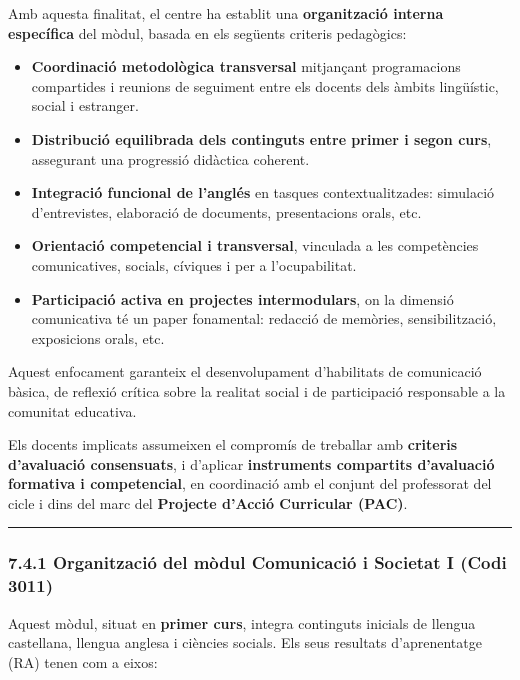 \documentclass[
  paper=a4,
  ,captions=tableheading
]{scrartcl}
\providecommand{\tightlist}{%
  \setlength{\itemsep}{0pt}\setlength{\parskip}{0pt}}
\begin{document}
Amb aquesta finalitat, el centre ha establit una \textbf{organització
interna específica} del mòdul, basada en els següents criteris
pedagògics:

\begin{itemize}
\tightlist
\item
  \textbf{Coordinació metodològica transversal} mitjançant programacions
  compartides i reunions de seguiment entre els docents dels àmbits
  lingüístic, social i estranger.
\item
  \textbf{Distribució equilibrada dels continguts entre primer i segon
  curs}, assegurant una progressió didàctica coherent.
\item
  \textbf{Integració funcional de l'anglés} en tasques
  contextualitzades: simulació d'entrevistes, elaboració de documents,
  presentacions orals, etc.
\item
  \textbf{Orientació competencial i transversal}, vinculada a les
  competències comunicatives, socials, cíviques i per a l'ocupabilitat.
\item
  \textbf{Participació activa en projectes intermodulars}, on la
  dimensió comunicativa té un paper fonamental: redacció de memòries,
  sensibilització, exposicions orals, etc.
\end{itemize}

Aquest enfocament garanteix el desenvolupament d'habilitats de
comunicació bàsica, de reflexió crítica sobre la realitat social i de
participació responsable a la comunitat educativa.

Els docents implicats assumeixen el compromís de treballar amb
\textbf{criteris d'avaluació consensuats}, i d'aplicar
\textbf{instruments compartits d'avaluació formativa i competencial}, en
coordinació amb el conjunt del professorat del cicle i dins del marc del
\textbf{Projecte d'Acció Curricular (PAC)}.

\begin{center}\rule{0.5\linewidth}{0.5pt}\end{center}

\hypertarget{organitzaciuxf3-del-muxf2dul-comunicaciuxf3-i-societat-i-codi-3011}{%
\subsubsection{7.4.1 Organització del mòdul Comunicació i Societat I
(Codi
3011)}\label{organitzaciuxf3-del-muxf2dul-comunicaciuxf3-i-societat-i-codi-3011}}

Aquest mòdul, situat en \textbf{primer curs}, integra continguts
inicials de llengua castellana, llengua anglesa i ciències socials. Els
seus resultats d'aprenentatge (RA) tenen com a eixos:
\end{document}
